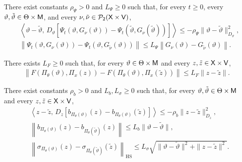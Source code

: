 \begin{assumption}
\label{ass:psi_assumptions}
There exist constants $\rho_\Psi>0$ and $L_\Psi\geq0$ such that, for every
$t\geq0$, every
$\vartheta,\tilde\vartheta\in\Theta\times{\mathsf{M}}$, and every
$\nu,\tilde\nu\in\mathcal P_2({\mathsf{X}}\times{\mathsf{V}})$,
\begin{align*}
&\left\langle
\vartheta-\tilde\vartheta,\,
D_\vartheta
\left[
\Psi_t(\vartheta,G_\nu(\vartheta))
-\Psi_t(\tilde\vartheta,G_\nu(\tilde\vartheta))
\right]
\right\rangle
\leq
-\rho_\Psi
\|\vartheta-\tilde\vartheta\|_{D_\vartheta}^2,\\
&\left\|
\Psi_t(\vartheta,G_\nu(\vartheta))
-\Psi_t(\vartheta,G_{\tilde\nu}(\vartheta))
\right\|
\leq
L_\Psi
\left\|G_\nu(\vartheta)-G_{\tilde\nu}(\vartheta)\right\|.
\end{align*}
\end{assumption}

\begin{assumption}
\label{ass:lipschitz_F}
There exists $L_F\geq0$ such that, for every
$\vartheta\in\Theta\times{\mathsf{M}}$ and every
$z,\tilde z\in{\mathsf{X}}\times{\mathsf{V}}$,
\begin{align*}
\left\|
F(\Pi_\theta(\vartheta),\Pi_x(z))
-F(\Pi_\theta(\vartheta),\Pi_x(\tilde z))
\right\|
\leq
L_F\|z-\tilde z\|.
\end{align*}
\end{assumption}

\begin{assumption}
\label{ass:SDE_assumptions}
There exist constants $\rho_b>0$ and $L_b,L_\sigma\geq0$ such that, for
every $\vartheta,\tilde\vartheta\in\Theta\times{\mathsf{M}}$ and every
$z,\tilde z\in{\mathsf{X}}\times{\mathsf{V}}$,
\begin{align*}
&\left\langle
z-\tilde z,\,
D_z
\left[
b_{\Pi_\theta(\vartheta)}(z)
-b_{\Pi_\theta(\vartheta)}(\tilde z)
\right]
\right\rangle
\leq
-\rho_b\|z-\tilde z\|_{D_z}^2,\\
&\left\|
b_{\Pi_\theta(\vartheta)}(z)
-b_{\Pi_\theta(\tilde\vartheta)}(z)
\right\|
\leq
L_b\|\vartheta-\tilde\vartheta\|,\\
&\left\|
\sigma_{\Pi_\theta(\vartheta)}(z)
-\sigma_{\Pi_\theta(\tilde\vartheta)}(\tilde z)
\right\|_{\mathrm{HS}}
\leq
L_\sigma
\sqrt{
\|\vartheta-\tilde\vartheta\|^2+\|z-\tilde z\|^2
}.
\end{align*}
\end{assumption}

